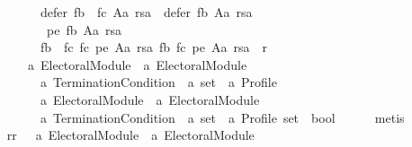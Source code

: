 \begin{isabellebody}
\ \ \ \ \ \ \ \ \ \ \ \ defer\ {\isacharparenleft}{\kern0pt}fb\ {\isasymtriangleright}\ fc{\isacharparenright}{\kern0pt}\ Aa\ rsa\ {\isasymsubset}\ defer\ fb\ Aa\ rsa\ {\isasymand}\isanewline
\ \ \ \ \ \ \ \ \ \ \ \ {\isasymnot}\ pe\ {\isacharparenleft}{\kern0pt}fb\ Aa\ rsa{\isacharparenright}{\kern0pt}\ {\isasymand}\isanewline
\ \ \ \ \ \ \ \ \ \ \ \ {\isacharparenleft}{\kern0pt}{\isacharparenleft}{\kern0pt}fb\ {\isasymtriangleright}\ fc{\isacharcomma}{\kern0pt}\ fc{\isacharcomma}{\kern0pt}\ pe{\isacharcomma}{\kern0pt}\ Aa{\isacharcomma}{\kern0pt}\ rsa{\isacharparenright}{\kern0pt}{\isacharcomma}{\kern0pt}\ fb{\isacharcomma}{\kern0pt}\ fc{\isacharcomma}{\kern0pt}\ pe{\isacharcomma}{\kern0pt}\ Aa{\isacharcomma}{\kern0pt}\ rsa{\isacharparenright}{\kern0pt}\ {\isasymnotin}\ r{\isacharparenright}{\kern0pt}{\isacharcolon}{\kern0pt}{\isacharcolon}{\kern0pt}\isanewline
\ \ \ \ \ \ \ \ \ \ {\isacharparenleft}{\kern0pt}{\isacharparenleft}{\kern0pt}{\isacharparenleft}{\kern0pt}{\isacharprime}{\kern0pt}a\ Electoral{\isacharunderscore}{\kern0pt}Module{\isacharparenright}{\kern0pt}\ {\isasymtimes}\ {\isacharparenleft}{\kern0pt}{\isacharprime}{\kern0pt}a\ Electoral{\isacharunderscore}{\kern0pt}Module{\isacharparenright}{\kern0pt}\ {\isasymtimes}\isanewline
\ \ \ \ \ \ \ \ \ \ \ \ {\isacharparenleft}{\kern0pt}{\isacharprime}{\kern0pt}a\ Termination{\isacharunderscore}{\kern0pt}Condition{\isacharparenright}{\kern0pt}\ {\isasymtimes}\ {\isacharprime}{\kern0pt}a\ set\ {\isasymtimes}\ {\isacharprime}{\kern0pt}a\ Profile{\isacharparenright}{\kern0pt}\ {\isasymtimes}\isanewline
\ \ \ \ \ \ \ \ \ \ \ \ {\isacharparenleft}{\kern0pt}{\isacharprime}{\kern0pt}a\ Electoral{\isacharunderscore}{\kern0pt}Module{\isacharparenright}{\kern0pt}\ {\isasymtimes}\ {\isacharparenleft}{\kern0pt}{\isacharprime}{\kern0pt}a\ Electoral{\isacharunderscore}{\kern0pt}Module{\isacharparenright}{\kern0pt}\ {\isasymtimes}\isanewline
\ \ \ \ \ \ \ \ \ \ \ \ {\isacharparenleft}{\kern0pt}{\isacharprime}{\kern0pt}a\ Termination{\isacharunderscore}{\kern0pt}Condition{\isacharparenright}{\kern0pt}\ {\isasymtimes}\ {\isacharprime}{\kern0pt}a\ set\ {\isasymtimes}\ {\isacharprime}{\kern0pt}a\ Profile{\isacharparenright}{\kern0pt}\ set\ {\isasymRightarrow}\ bool{\isacharparenright}{\kern0pt}{\isachardoublequoteclose}\isanewline
\ \ \ \ \isamarkupfalse%
\ metis\isanewline
\ \ \isamarkupfalse%
\isanewline
\ \ \ \ rr\ {\isacharcolon}{\kern0pt}{\isacharcolon}{\kern0pt}\ \ {\isachardoublequoteopen}{\isacharparenleft}{\kern0pt}{\isacharparenleft}{\kern0pt}{\isacharparenleft}{\kern0pt}{\isacharprime}{\kern0pt}a\ Electoral{\isacharunderscore}{\kern0pt}Module{\isacharparenright}{\kern0pt}\ {\isasymtimes}\ {\isacharparenleft}{\kern0pt}{\isacharprime}{\kern0pt}a\ Electoral{\isacharunderscore}{\kern0pt}Module{\isacharparenright}{\kern0pt}\ {\isasymtimes}\isanewline

\end{isabellebody}
